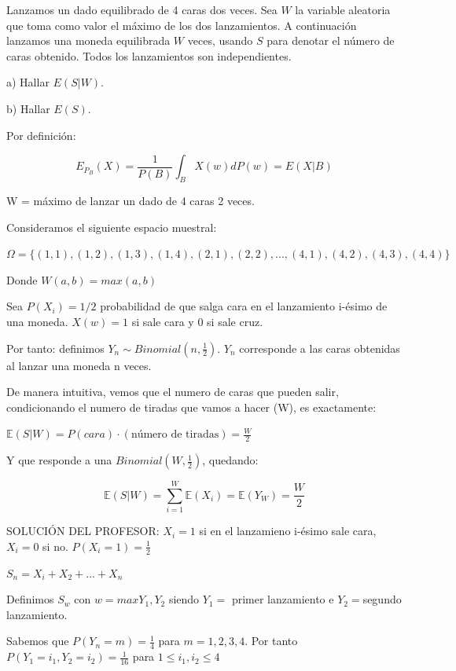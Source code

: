 \begin{problem}[4]Lanzamos un dado equilibrado de 4 caras dos veces. Sea $W$ la variable aleatoria que toma como valor
el m\'aximo de los dos lanzamientos. A continuaci\'on lanzamos una moneda equilibrada $W$ veces,  usando
$S$ para denotar el n\'umero de caras obtenido. Todos los lanzamientos son independientes.

a) Hallar $E(S|W)$.
 
b)  Hallar $E(S)$.
\solution

\begin{expla}
Por definición:

\[
E_{P_B}(X)=\frac{1}{P(B)}\int_{B}X(w)dP(w)=E(X|B)
\]

W = máximo de lanzar un dado de 4 caras 2 veces.

Consideramos el siguiente espacio muestral:

$\Omega=\{(1,1),(1,2),(1,3),(1,4),(2,1),(2,2),...,(4,1),(4,2),(4,3),(4,4)\}$

Donde $W(a,b)=max(a,b)$

Sea $P(X_i)=1/2$ probabilidad de que salga cara en el lanzamiento i-ésimo de una moneda. $X(w)=1$ si sale cara y 0 si sale cruz.

Por tanto: definimos $Y_n \sim Binomial(n,\frac{1}{2})$. $Y_n$ corresponde a las caras obtenidas al lanzar una moneda n veces.

\end{expla}


\spart
De manera intuitiva, vemos que el numero de caras que pueden salir, condicionando el numero de tiradas que vamos a hacer (W), es exactamente:

$\mathbb{E}(S|W)=P(cara)\cdot(\text{número de tiradas})=\frac{W}{2}$

Y que responde a una $Binomial(W,\frac{1}{2})$, quedando:

\[
\mathbb{E}(S|W)=\sum_{i=1}^{W}\mathbb{E}(X_i)=\mathbb{E}(Y_W)=\frac{W}{2}
\] 


SOLUCIÓN DEL PROFESOR:
$X_i=1$ si en el lanzamieno i-ésimo sale cara, $X_i=0$ si no. $P(X_i=1)=\frac{1}{2}$

$S_n=X_i + X_2 +...+X_n$

Definimos $S_w$ con $w=max{Y_1,Y_2}$ siendo $Y_1=$ primer lanzamiento e $Y_2=$segundo lanzamiento.

Sabemos que $P(Y_n=m)=\frac{1}{4}$ para $m=1,2,3,4$. Por tanto $P(Y_1=i_1,Y_2=i_2)=\frac{1}{16}$ para $1\leq i_1, i_2 \leq 4$


\end{problem}
